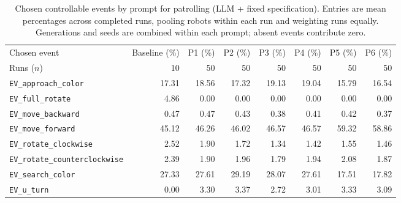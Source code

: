 \begin{table}[htbp]
\centering
\small
\caption{Chosen controllable events by prompt for patrolling (LLM + fixed specification). Entries are mean percentages across completed runs, pooling robots within each run and weighting runs equally. Generations and seeds are combined within each prompt; absent events contribute zero.}
\label{tab:patrolling-with-fixed-spec-prompt-events}
\begin{tabular}{lrrrrrrr}
\hline
Chosen event & Baseline (\%) & P1 (\%) & P2 (\%) & P3 (\%) & P4 (\%) & P5 (\%) & P6 (\%) \\
Runs ($n$) & 10 & 50 & 50 & 50 & 50 & 50 & 50 \\
\hline
\texttt{EV\_approach\_color} & 17.31 & 18.56 & 17.32 & 19.13 & 19.04 & 15.79 & 16.54 \\
\texttt{EV\_full\_rotate} & 4.86 & 0.00 & 0.00 & 0.00 & 0.00 & 0.00 & 0.00 \\
\texttt{EV\_move\_backward} & 0.47 & 0.47 & 0.43 & 0.38 & 0.41 & 0.42 & 0.37 \\
\texttt{EV\_move\_forward} & 45.12 & 46.26 & 46.02 & 46.57 & 46.57 & 59.32 & 58.86 \\
\texttt{EV\_rotate\_clockwise} & 2.52 & 1.90 & 1.72 & 1.34 & 1.42 & 1.55 & 1.46 \\
\texttt{EV\_rotate\_counterclockwise} & 2.39 & 1.90 & 1.96 & 1.79 & 1.94 & 2.08 & 1.87 \\
\texttt{EV\_search\_color} & 27.33 & 27.61 & 29.19 & 28.07 & 27.61 & 17.51 & 17.82 \\
\texttt{EV\_u\_turn} & 0.00 & 3.30 & 3.37 & 2.72 & 3.01 & 3.33 & 3.09 \\
\hline
\end{tabular}
\end{table}
